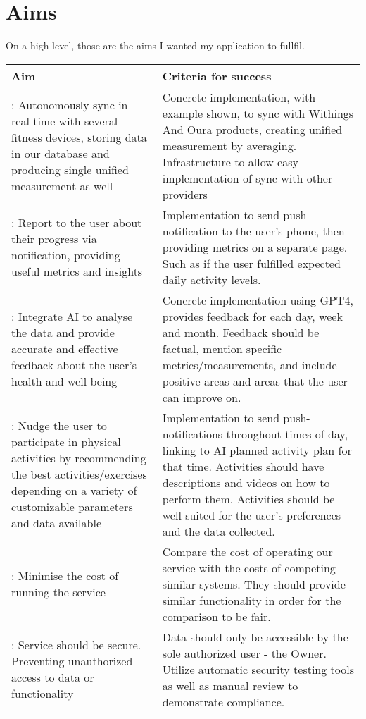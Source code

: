 \section{Aims}
On a high-level, those are the aims I wanted my application to fullfil.
\begin{center}
    \begin{tabularx}{1\textwidth} {| >{\centering\arraybackslash}X 
        | >{\centering\arraybackslash}X 
        |}
    \hline
    Aim & Criteria for success  \\ 
    \hline
     1: Autonomously sync in real-time with several fitness devices, storing data in our database and producing single unified measurement as well & Concrete implementation, with example shown, to sync with Withings And Oura products, creating unified measurement by averaging.  Infrastructure to allow easy implementation of sync with other providers\\ 
    \hline
     2: Report to the user about their progress via notification, providing useful metrics and insights & Implementation to send push notification to the user's phone, then providing metrics on a separate page. Such as if the user fulfilled expected daily activity levels. \\ 
    \hline
     3: Integrate AI to analyse the data and provide accurate and effective feedback about the user's health and well-being & Concrete implementation using GPT4, provides feedback for each day, week and month. Feedback should be factual, mention specific metrics/measurements, and include positive areas and areas that the user can improve on.\\
    \hline
     4: Nudge the user to participate in physical activities by recommending the best activities/exercises depending on a variety of customizable parameters and data available &  Implementation to send push-notifications throughout times of day, linking to AI planned activity plan for that time. Activities should have descriptions and videos on how to perform them. Activities should be well-suited for the user's preferences and the data collected.\\
    \hline
     5: Minimise the cost of running the service & Compare the cost of operating our service with the costs of competing similar systems. They should provide similar functionality in order for the comparison to be fair. \\
    \hline
     6: Service should be secure. Preventing unauthorized access to data or functionality & Data should only be accessible by the sole authorized user - the Owner. Utilize automatic security testing tools as well as manual review to demonstrate compliance.\\

\end{tabularx}
\end{center}
